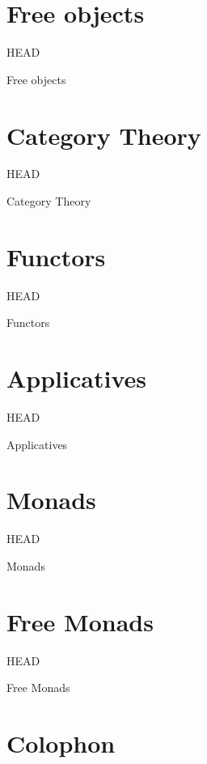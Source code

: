 \documentclass[presentation,14pt]{beamer}
\newcommand{\head}[1]{\begin{center}
\vspace{13mm}\hspace{-1mm}\Huge{{#1}}
\end{center}}
\begin{document}
\section{Free objects}
\label{sec-11}
\begin{frame}[fragile,plain,label=sec-11-1]{HEAD}
\head{Free objects}
\end{frame}
\section{Category Theory}
\label{sec-12}
\begin{frame}[fragile,plain,label=sec-12-1]{HEAD}
\head{Category Theory}
\end{frame}
\section{Functors}
\label{sec-13}
\begin{frame}[fragile,plain,label=sec-13-1]{HEAD}
\head{Functors}
\end{frame}
\section{Applicatives}
\label{sec-14}
\begin{frame}[fragile,plain,label=sec-14-1]{HEAD}
\head{Applicatives}
\end{frame}
\section{Monads}
\label{sec-15}
\begin{frame}[fragile,plain,label=sec-15-1]{HEAD}
\head{Monads}
\end{frame}
\section{Free Monads}
\label{sec-16}
\begin{frame}[fragile,plain,label=sec-16-1]{HEAD}
\head{Free Monads}
\end{frame}
\section{Colophon}
\label{sec-17}
\end{document}
